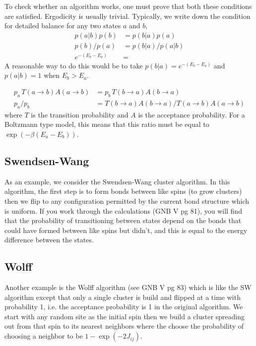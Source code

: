 \documentclass[aps,prl,twocolumn]{revtex4-1}
\begin{document}
To check whether an algorithm works, one must prove that both these conditions are satisfied. Ergodicity is usually trivial. Typically, we write down the condition for detailed balance for any two states $a$ and $b$,
\begin{align}
	p(a|b)p(b) &= p(b|a)p(a) \\
	p(b)/p(a) &= p(b|a)/p(a|b) \\
	e^{-(E_b-E_a)} &= 
\end{align}
A reasonable way to do this would be to take $p(b|a) = e^{-(E_b-E_a)}$ and $p(a|b) = 1$ when $E_b>E_a$.

\begin{align}
	p_a\,T(a\rightarrow b)A(a\rightarrow b) &= p_b\,T(b\rightarrow a)A(b\rightarrow a)\\
	p_a/p_b &= T(b\rightarrow a)A(b\rightarrow a)/T(a\rightarrow b)A(a\rightarrow b)
\end{align}
where $T$ is the transition probability and $A$ is the acceptance probability. For a Boltzmann type model, this means that this ratio must be equal to $\exp(-\beta(E_a-E_b))$.

\subsection{Swendsen-Wang}
As an example, we consider the Swendsen-Wang cluster algorithm. In this algorithm, the first step is to form bonds between like spins (to grow clusters) then we flip to any configuration permitted by the current bond structure which is uniform. If you work through the calculations (GNB V pg 81), you will find that the probability of transitioning between states depend on the bonds that could have formed between like spins but didn't, and this is equal to the energy difference between the states.

\subsection{Wolff}
Another example is the Wolff algorithm (see GNB V pg 83) which is like the SW algorithm except that only a single cluster is build and flipped at a time with probability 1, i.e. the acceptance probability is 1 in the original algorithm. We start with any random site as the initial spin then we build a cluster spreading out from that spin to its nearest neighbors where the choose the probability of choosing a neighbor to be $1-\exp(-2J_{ij})$.
\end{document}

